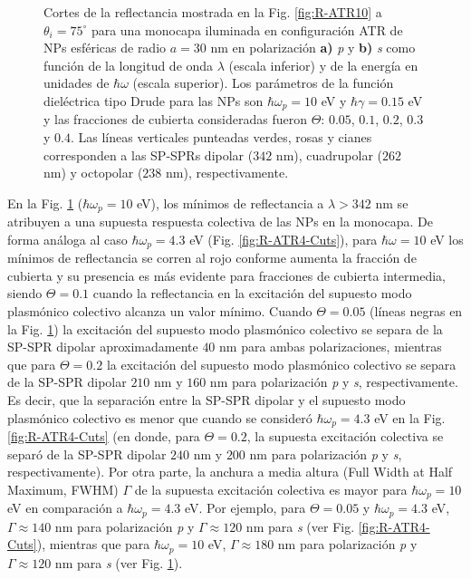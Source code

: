 \begin{figure}[h!]
	\caption{Cortes de la reflectancia mostrada en la Fig. \ref{fig:R-ATR10} a $\theta_i = 75^\circ$ para una monocapa iluminada en configuración ATR de NPs esféricas de radio $a=30$ nm en polarización \textbf{a)} \emph{p} y \textbf{b)} \emph{s} como función de la longitud de onda $\lambda$ (escala inferior) y de la energía en unidades de $\hbar\omega$ (escala superior). Los parámetros de la función dieléctrica tipo Drude para las NPs son $\hbar\omega_p = 10$ eV y $\hbar\gamma = 0.15$ eV y las fracciones de cubierta consideradas fueron $\Theta$: $0. 05$, $0. 1$, $0. 2$, $0. 3$ y $0. 4$. Las líneas verticales punteadas verdes, rosas y cianes corresponden a las SP-SPRs dipolar ($342$ nm), cuadrupolar ($262$ nm) y octopolar ($238$ nm), respectivamente.  }\label{fig:R-ATR10-Cuts}
	\end{figure}	

En la Fig. \ref{fig:R-ATR10-Cuts} ($\hbar\omega_p=10$ eV), los mínimos de reflectancia a $\lambda > 342$ nm se atribuyen a una supuesta respuesta colectiva de las NPs en la monocapa. De forma análoga al caso $\hbar\omega_p = 4.3$ eV (Fig. \ref{fig:R-ATR4-Cuts}), para $\hbar\omega=10$ eV los mínimos de reflectancia se corren al rojo conforme aumenta la fracción de cubierta y su presencia es más evidente para fracciones de cubierta intermedia, siendo  $\Theta=0.1$ cuando la reflectancia en la excitación del supuesto modo plasmónico colectivo alcanza un valor mínimo. Cuando $\Theta = 0.05$ (líneas negras en la Fig. \ref{fig:R-ATR10-Cuts}) la excitación del supuesto modo plasmónico colectivo se separa de la SP-SPR dipolar  aproximadamente $40$ nm para ambas polarizaciones, mientras que para $\Theta = 0.2$ la excitación del supuesto modo plasmónico colectivo se separa de la SP-SPR dipolar  $210$ nm y $160$ nm para polarización \emph{p} y \emph{s}, respectivamente. Es decir, que la separación entre la SP-SPR dipolar y el supuesto modo plasmónico colectivo es menor que cuando se consideró $\hbar\omega_p = 4.3$ eV en la Fig. \ref{fig:R-ATR4-Cuts} (en donde, para $\Theta=0.2$, la supuesta excitación colectiva se separó de la SP-SPR dipolar $240$ nm y $200$ nm para polarización \emph{p} y \emph{s}, respectivamente). Por otra parte, la anchura a media altura (Full Width at Half Maximum, FWHM) $\Gamma$ de la supuesta excitación colectiva es mayor para $\hbar\omega_p=10$ eV en comparación a $\hbar\omega_p=4.3$ eV. Por ejemplo, para $\Theta = 0.05$ y $\hbar\omega_p = 4.3$ eV,  $\Gamma\approx 140$ nm para polarización \emph{p} y  $\Gamma\approx 120$ nm para  \emph{s} (ver Fig. \ref{fig:R-ATR4-Cuts}), mientras que para  $\hbar\omega_p = 10$ eV,  $\Gamma\approx 180$ nm para polarización \emph{p} y  $\Gamma\approx 120$ nm para  \emph{s} (ver Fig. \ref{fig:R-ATR10-Cuts}).

